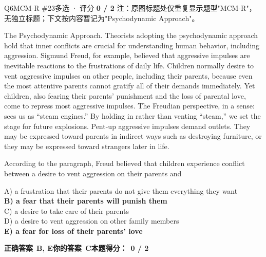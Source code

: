 \begin{qblock}{Q6\quad MCM-R \#23}{多选 · 评分 \textcolor{cAccent}{\bfseries 0 / 2}}
{\footnotesize\color{gray} 注：原图标题处仅重复显示题型"MCM-R"，无独立标题；下文按内容暂记为"Psychodynamic Approach"。}
\begin{promptbox}
The Psychodynamic Approach. Theorists adopting the psychodynamic approach hold that inner conflicts are crucial for understanding human behavior, including aggression. Sigmund Freud, for example, believed that aggressive impulses are inevitable reactions to the frustrations of daily life. Children normally desire to vent aggressive impulses on other people, including their parents, because even the most attentive parents cannot gratify all of their demands immediately. Yet children, also fearing their parents' punishment and the loss of parental love, come to repress most aggressive impulses. The Freudian perspective, in a sense: sees us as ``steam engines.'' By holding in rather than venting ``steam,'' we set the stage for future explosions. Pent-up aggressive impulses demand outlets. They may be expressed toward parents in indirect ways such as destroying furniture, or they may be expressed toward strangers later in life.
\end{promptbox}
\begin{notebox}According to the paragraph, Freud believed that children experience conflict between a desire to vent aggression on their parents and\end{notebox}
{\small
A) a frustration that their parents do not give them everything they want\\
{\color{cFix}\textbf{B) a fear that their parents will punish them}}\\
C) a desire to take care of their parents\\
D) a desire to vent aggression on other family members\\
{\color{cFix}\textbf{E) a fear for loss of their parents' love}}}
\par\smallskip
\textbf{正确答案}\ \textcolor{cFix}{\bfseries B, E}\qquad\textbf{你的答案}\ {\color{cWrong}\bfseries C}\qquad\textbf{本题得分：}\ {\color{cAccent}\bfseries 0 / 2}
\end{qblock}

